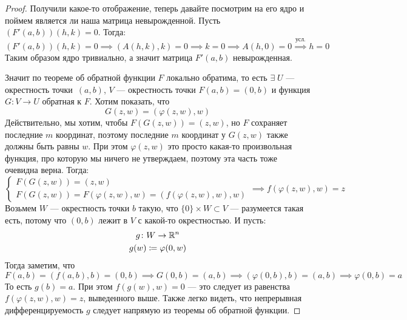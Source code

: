 \begin{proof}
    Получили какое-то отображение, теперь давайте посмотрим на его ядро и поймем является ли наша матрица невырожденной. Пусть $(F'(a, b))(h, k) = 0$. Тогда:
    \begin{equation*}
      (F'(a, b))(h, k) = 0 \implies (A(h, k), k) = 0 \implies k = 0 \implies A(h, 0) = 0 \overset{\text{усл.}}{\implies} h = 0
    \end{equation*}
    Таким образом ядро тривиально, а значит матрица $F'(a, b)$ невырожденная.
  
    Значит по теореме об обратной функции $F$ локально обратима, то есть $\exists\; U$ --- окрестность точки~$(a, b)$, $V$ --- окрестность точки $F(a, b) = (0, b)$ и функция $G\colon V \to U$ обратная к $F$. Хотим показать, что
    \begin{equation*}
      G(z, w) = (\varphi(z, w), w)
    \end{equation*}
    Действительно, мы хотим, чтобы $F(G(z, w)) = (z, w)$, но $F$ сохраняет последние $m$ координат, поэтому последние $m$ координат у $G(z, w)$ также должны быть равны $w$. При этом $\varphi(z, w)$ это просто какая-то произвольная функция, про которую мы ничего не утверждаем, поэтому эта часть тоже очевидна верна. Тогда:
    \begin{equation*}
      \begin{cases}
        F(G(z, w)) = (z ,w) \\
        F(G(z, w)) = F(\varphi(z, w), w) = (f(\varphi(z, w), w), w)
      \end{cases}
      \implies f(\varphi(z, w), w) = z
    \end{equation*}
    Возьмем $W$ --- окрестность точки $b$ такую, что $\{0\} \times W \subset V$ --- разумеется такая есть, потому что $(0, b)$ лежит в $V$ с какой-то окрестностью. И пусть:
    \begin{equation*}
      \begin{gathered}
        g\colon W \to \mathbb{R}^n \\
        g(w) \coloneqq \varphi(0, w)
      \end{gathered}
    \end{equation*}
    Тогда заметим, что 
    \begin{equation*}
      F(a, b) = (f(a, b), b) = (0, b) \implies G(0, b) = (a, b) \implies (\varphi(0, b), b) = (a, b) \implies \varphi(0, b) = a
    \end{equation*}
    То есть $g(b) = a$. При этом $f(g(w), w) = 0$ --- это следует из равенства $f(\varphi(z, w), w) = z$, выведенного выше. Также легко видеть, что непрерывная дифференцируемость $g$ следует напрямую из теоремы об обратной функции. 
  

\end{proof}
